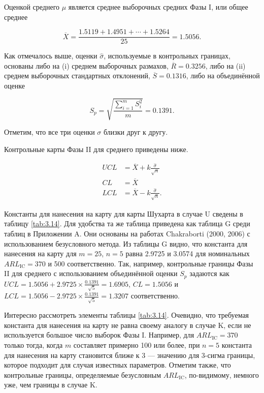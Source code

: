 Оценкой среднего \(\mu\) является среднее выборочных средних Фазы I, или общее среднее

\[
\overline{X} = \frac{1.5119 + 1.4951 + \cdots + 1.5264}{25} = 1.5056.
\]

Как отмечалось выше, оценки \(\hat{\sigma}\), используемые в контрольных границах, основаны либо на (i) среднем выборочных размахов, \(\overline{R} = 0.3256\), либо на (ii) среднем выборочных стандартных отклонений, \(\overline{S} = 0.1316\), либо на объединённой оценке

\[
S_p = \sqrt{\frac{\sum_{i=1}^{m} S_i^2}{m}} = 0.1391.
\]

Отметим, что все три оценки \(\sigma\) близки друг к другу.

Контрольные карты Фазы II для среднего приведены ниже.

\begin{equation}
	\begin{aligned}
		UCL &= \overline{X} + k\frac{\hat{\sigma}}{\sqrt{n}} \\
		CL &= \overline{X} \\
		LCL &= \overline{X} - k\frac{\hat{\sigma}}{\sqrt{n}}.
	\end{aligned}
	\label{eq:3.35}
\end{equation}

Константы для нанесения на карту для карты Шухарта в случае U сведены в таблицу \ref{tab:3.14}. Для удобства та же таблица приведена как таблица G среди таблиц в Приложении A. Они основаны на работах Chakraborti (2000, 2006) с использованием безусловного метода. Из таблицы G видно, что константа для нанесения на карту для \(m = 25\), \(n = 5\) равна 2.9725 и 3.0574 для номинальных \(ARL_{\text{IC}} = 370\) и 500 соответственно. Так, например, контрольные границы Фазы II для среднего с использованием объединённой оценки \(S_p\) задаются как \(UCL = 1.5056 + 2.9725 \times \frac{0.1391}{\sqrt{5}} = 1.6905\), \(CL = 1.5056\) и \(LCL = 1.5056 - 2.9725 \times \frac{0.1391}{\sqrt{5}} = 1.3207\) соответственно.

Интересно рассмотреть элементы таблицы \ref{tab:3.14}. Очевидно, что требуемая константа для нанесения на карту не равна своему аналогу в случае K, если не используется большое число выборок Фазы I. Например, для \(ARL_{\text{IC}} = 370\) только тогда, когда \(m\) составляет примерно 100 или более, при \(n = 5\) константа для нанесения на карту становится ближе к 3 — значению для 3-сигма границы, которое подходит для случая известных параметров. Отметим также, что контрольные границы, определяемые безусловным \(ARL_{\text{IC}}\), по-видимому, немного уже, чем границы в случае K.

